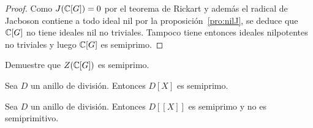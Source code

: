\begin{proof}
	Como $J(\mathbb{C}[G])=0$ por el teorema de Rickart y además el radical de Jacboson
	contiene a todo ideal nil por la proposición~\ref{pro:nilJ}, se deduce que
	$\mathbb{C}[G]$ no tiene ideales nil no triviales. Tampoco tiene entonces ideales
	nilpotentes no triviales y luego $\mathbb{C}[G]$ es semiprimo.
\end{proof}

\begin{exercise}
	Demuestre que $Z(\mathbb{C}[G])$ es semiprimo.
\end{exercise}


\begin{example}
	Sea $D$ un anillo de división. Entonces $D[X]$ es semiprimo.
\end{example}

\begin{example}
	Sea $D$ un anillo de división. Entonces $D[[X]]$ es semiprimo y no es
	semiprimitivo.
\end{example}




